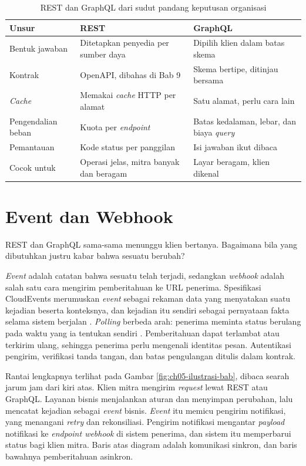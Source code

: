 \begin{table}[!htb]
  \centering
  \caption{REST dan GraphQL dari sudut pandang keputusan organisasi}
  \label{tab:ch05-rest-graphql}
  \small
  \begin{tabularx}{\textwidth}{V{2.7cm}UU}
    \hline
    \textbf{Unsur} & \textbf{REST} & \textbf{GraphQL} \\ \hline
    Bentuk jawaban & Ditetapkan penyedia per sumber daya & Dipilih klien dalam batas skema \\ \hline
    Kontrak & OpenAPI, dibahas di Bab 9 & Skema bertipe, ditinjau bersama \\ \hline
    \textit{Cache} & Memakai \textit{cache} HTTP per alamat & Satu alamat, perlu cara lain \\ \hline
    Pengendalian beban & Kuota per \textit{endpoint} & Batas kedalaman, lebar, dan biaya \textit{query} \\ \hline
    Pemantauan & Kode status per panggilan & Isi jawaban ikut dibaca \\ \hline
    Cocok untuk & Operasi jelas, mitra banyak dan beragam & Layar beragam, klien dikenal \\ \hline
  \end{tabularx}
\end{table}

\section{Event dan Webhook}

REST dan GraphQL sama-sama menunggu klien bertanya. Bagaimana bila yang dibutuhkan justru kabar bahwa sesuatu berubah?

\textit{Event} adalah catatan bahwa sesuatu telah terjadi, sedangkan \textit{webhook} adalah salah satu cara mengirim
pemberitahuan ke URL penerima. Spesifikasi CloudEvents merumuskan \textit{event} sebagai rekaman data yang menyatakan suatu
kejadian beserta konteksnya, dan kejadian itu sendiri sebagai pernyataan fakta selama sistem berjalan \cite{c05-cloudevents}.
\textit{Polling} berbeda arah: penerima meminta status berulang pada waktu yang ia tentukan sendiri \cite{c05-hohpe2003eip}.
Pemberitahuan dapat terlambat atau terkirim ulang, sehingga penerima perlu mengenali identitas pesan. Autentikasi pengirim,
verifikasi tanda tangan, dan batas pengulangan ditulis dalam kontrak.

Rantai lengkapnya terlihat pada Gambar \ref{fig:ch05-ilustrasi-bab}, dibaca searah jarum jam dari kiri atas. Klien mitra
mengirim \textit{request} lewat REST atau GraphQL. Layanan bisnis menjalankan aturan dan menyimpan perubahan, lalu mencatat
kejadian sebagai \textit{event} bisnis. \textit{Event} itu memicu pengirim notifikasi, yang menangani \textit{retry} dan
rekonsiliasi. Pengirim notifikasi mengantar \textit{payload} notifikasi ke \textit{endpoint webhook} di sistem penerima, dan
sistem itu memperbarui status bagi klien mitra. Baris atas diagram adalah komunikasi sinkron, dan baris bawahnya pemberitahuan
asinkron.

